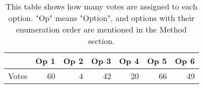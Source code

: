 \documentclass[11pt,review,sigplan,nonacm,natbib=false]{acmart}
\begin{document}
\begin{table}
    \centering
    \begin{tabular}{ccccccc}
    \hline
    & Op 1 & Op 2 & Op 3 & Op 4 & Op 5 & Op 6 \\
    \hline
    \multicolumn{1}{l}{Votes} & \multicolumn{1}{r}{60} & \multicolumn{1}{r}{4} & \multicolumn{1}{r}{42} & \multicolumn{1}{r}{20} & \multicolumn{1}{r}{66} & \multicolumn{1}{r}{49} \\
    \hline
    \end{tabular}
\caption{This table shows how many votes are assigned to each option. "Op" means "Option", and options with their enumeration order are mentioned in the Method section.}
\label{tab:tab4}
\end{table}


\end{document}
